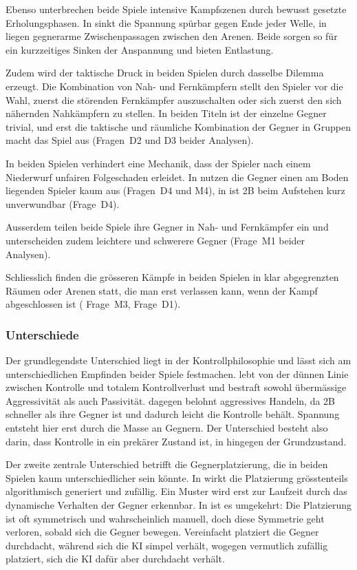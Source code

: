 \documentclass[../Main.tex]{subfiles}
\begin{document}
Ebenso unterbrechen beide Spiele intensive Kampfszenen durch bewusst gesetzte Erholungsphasen. In  sinkt die Spannung spürbar gegen Ende jeder Welle, in  liegen gegnerarme Zwischenpassagen zwischen den Arenen. Beide sorgen so für ein kurzzeitiges Sinken der Anspannung und bieten Entlastung.

Zudem wird der taktische Druck in beiden Spielen durch dasselbe Dilemma erzeugt. Die Kombination von Nah- und Fernkämpfern stellt den Spieler vor die Wahl, zuerst die störenden Fernkämpfer auszuschalten oder sich zuerst den sich nähernden Nahkämpfern zu stellen. In beiden Titeln ist der einzelne Gegner trivial, und erst die taktische und räumliche Kombination der Gegner in Gruppen macht das Spiel aus (Fragen~D2 und D3 beider Analysen).

In beiden Spielen verhindert eine Mechanik, dass der Spieler nach einem Niederwurf unfairen Folgeschaden erleidet. In  nutzen die Gegner einen am Boden liegenden Spieler kaum aus (Fragen~D4 und M4), in  ist 2B beim Aufstehen kurz unverwundbar (Frage~D4).

Ausserdem teilen beide Spiele ihre Gegner in Nah- und Fernkämpfer ein und unterscheiden zudem leichtere und schwerere Gegner (Frage~M1 beider Analysen).

Schliesslich finden die grösseren Kämpfe in beiden Spielen in klar abgegrenzten Räumen oder Arenen statt, die man erst verlassen kann, wenn der Kampf abgeschlossen ist ( Frage~M3,  Frage~D1).

\subsubsection{Unterschiede}

Der grundlegendste Unterschied liegt in der Kontrollphilosophie und lässt sich am unterschiedlichen Empfinden beider Spiele festmachen.  lebt von der dünnen Linie zwischen Kontrolle und totalem Kontrollverlust und bestraft sowohl übermässige Aggressivität als auch Passivität.  dagegen belohnt aggressives Handeln, da 2B schneller als ihre Gegner ist und dadurch leicht die Kontrolle behält. Spannung entsteht hier erst durch die Masse an Gegnern. Der Unterschied besteht also darin, dass Kontrolle in  ein prekärer Zustand ist, in  hingegen der Grundzustand.

Der zweite zentrale Unterschied betrifft die Gegnerplatzierung, die in beiden Spielen kaum unterschiedlicher sein könnte. In  wirkt die Platzierung grösstenteils algorithmisch generiert und zufällig. Ein Muster wird erst zur Laufzeit durch das dynamische Verhalten der Gegner erkennbar. In  ist es umgekehrt: Die Platzierung ist oft symmetrisch und wahrscheinlich manuell, doch diese Symmetrie geht verloren, sobald sich die Gegner bewegen. Vereinfacht platziert  die Gegner durchdacht, während sich die KI simpel verhält, wogegen  vermutlich zufällig platziert, sich die KI dafür aber durchdacht verhält.
\end{document}
